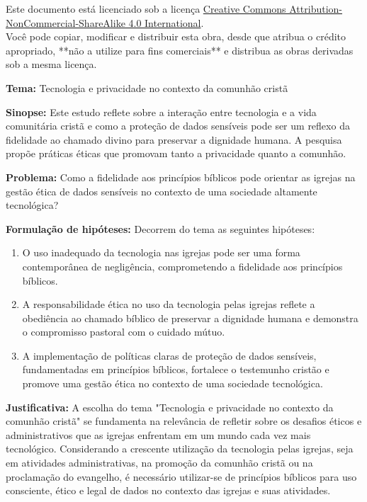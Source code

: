 \documentclass[12pt,a4paper]{article}
\newcommand{\tema}{Tecnologia e privacidade no contexto da comunhão cristã}
\begin{document}
\hypersetup{pageanchor=false}  %





\newpage
\pagestyle{plain}
\begin{center}
    {\small Este documento está licenciado sob a licença \href{https://creativecommons.org/licenses/by-nc-sa/4.0/}{Creative Commons Attribution-NonCommercial-ShareAlike 4.0 International}.\\
    Você pode copiar, modificar e distribuir esta obra, desde que atribua o crédito apropriado, **não a utilize para fins comerciais** e distribua as obras derivadas sob a mesma licença.}
\end{center}


\newpage
\pagestyle{plain}
\renewcommand{\baselinestretch}{1.5}
\normalsize
\noindent
\textbf{Tema:} \tema

\noindent
\textbf{Sinopse:} Este estudo reflete sobre a interação entre tecnologia e a vida comunitária cristã e como a proteção de dados sensíveis pode ser um reflexo da fidelidade ao chamado divino para preservar a dignidade humana. A pesquisa propõe práticas éticas que promovam tanto a privacidade quanto a comunhão.

\noindent
\textbf{Problema:} Como a fidelidade aos princípios bíblicos pode orientar as igrejas na gestão ética de dados sensíveis no contexto de uma sociedade altamente tecnológica?

\noindent
\textbf{Formulação de hipóteses:}
Decorrem do tema as seguintes hipóteses:
\begin{enumerate}
    \item O uso inadequado da tecnologia nas igrejas pode ser uma forma contemporânea de negligência, comprometendo a fidelidade aos princípios bíblicos.
    \item A responsabilidade ética no uso da tecnologia pelas igrejas reflete a obediência ao chamado bíblico de preservar a dignidade humana e demonstra o compromisso pastoral com o cuidado mútuo.
    \item A implementação de políticas claras de proteção de dados sensíveis, fundamentadas em princípios bíblicos, fortalece o testemunho cristão e promove uma gestão ética no contexto de uma sociedade tecnológica.
\end{enumerate}

\noindent
\textbf{Justificativa:} A escolha do tema "\tema" se fundamenta na relevância de refletir sobre os desafios éticos e administrativos que as igrejas enfrentam em um mundo cada vez mais tecnológico. Considerando a crescente utilização da tecnologia pelas igrejas, seja em atividades administrativas, na promoção da comunhão cristã ou na proclamação do evangelho, é necessário utilizar-se de princípios bíblicos para uso consciente, ético e legal de dados no contexto das igrejas e suas atividades.
\end{document}
